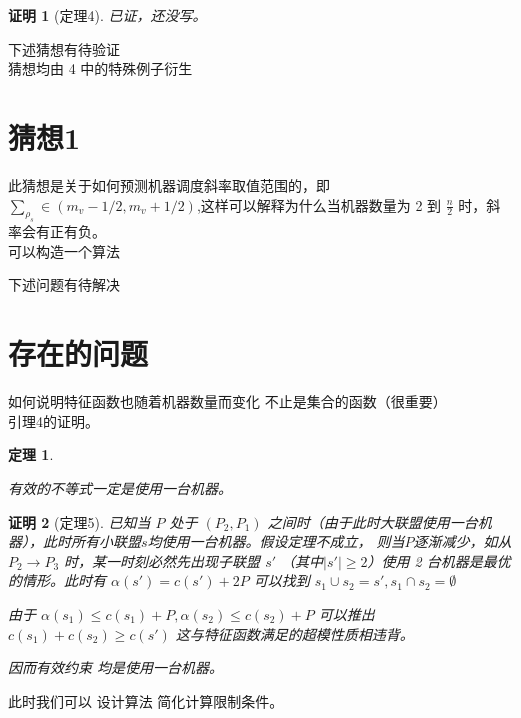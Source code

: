 \documentclass[UTF8]{article}
\newtheorem{thm}{\hspace{2em}定理}
\newtheorem{pf}{\hspace{2em}证明}
\begin{document}
\begin{pf}[定理4]

已证，还没写。
\end{pf}


下述猜想有待验证   \\
猜想均由 4 中的特殊例子衍生
\section*{猜想1}
此猜想是关于如何预测机器调度斜率取值范围的，即
$\sum_{\rho_s} \in (m_v-1/2,m_v+1/2)$,这样可以解释为什么当机器数量为 2 到 $\frac{n}{2}$ 时，斜率会有正有负。\\

可以构造一个算法

下述问题有待解决
\section{存在的问题}
如何说明特征函数也随着机器数量而变化   不止是集合的函数（很重要）   \\


引理4的证明。


\begin{thm}\label{thm5}

有效的不等式一定是使用一台机器。

\end{thm}

\begin{pf}[定理5]

已知当 $P$ 处于 $(P_2,P_1)$ 之间时（由于此时大联盟使用一台机器），此时所有小联盟$ s$均使用一台机器。假设定理不成立，
则当$P$逐渐减少，如从$ P_2 \to P_3$ 时，某一时刻必然先出现子联盟 $s'$ （其中$|s'| \geq 2 $）使用 2 台机器是最优的情形。此时有
$ \alpha(s') = c(s') +2P $  可以找到 $ s_1 \cup s_2 = s',s_1 \cap s_2 = \emptyset $

由于 $\alpha(s_1) \leq c(s_1) + P , \alpha(s_2) \leq c(s_2) + P $
可以推出 $ c(s_1) + c(s_2) \geq c(s') $  这与特征函数满足的超模性质相违背。

因而有效约束 均是使用一台机器。

\end{pf}

此时我们可以 设计算法 简化计算限制条件。
\end{document}
